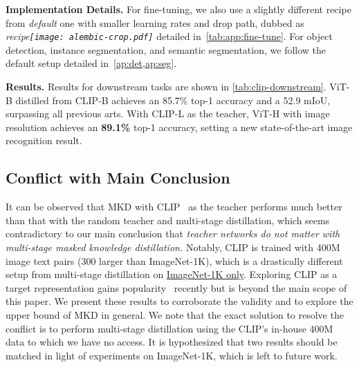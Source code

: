\documentclass[10pt,twocolumn,letterpaper]{article}
\def \alambic {\texttt{[image: alembic-crop.pdf]}\xspace}
\begin{document}
\noindent\textbf{Implementation Details.} For fine-tuning, we also use a slightly different recipe from \textit{default} one with smaller learning rates and drop path, dubbed as \textit{recipe\alambic} detailed in~\cref{tab:app:fine-tune}. For object detection, instance segmentation, and semantic segmentation, we follow the default setup detailed in~\cref{ap:det,ap:seg}.

\noindent\textbf{Results.} Results for downstream tasks are shown in \cref{tab:clip-downstream}. 
ViT-B distilled from CLIP-B achieves an 85.7\% top-1 accuracy and a 52.9 mIoU, surpassing all previous arts.
With CLIP-L as the teacher, ViT-H with image resolution  achieves an \textbf{89.1\%} top-1 accuracy, setting a new state-of-the-art image recognition result.

\subsection{Conflict with Main Conclusion}

It can be observed that MKD with CLIP~\cite{clip} as the teacher performs much better than that with the random teacher and multi-stage distillation, which seems contradictory to our main conclusion that \textit{teacher networks do not matter with multi-stage masked knowledge distillation.}
Notably, CLIP is trained with 400M image text pairs (300 larger than ImageNet-1K), which is a drastically different setup from multi-stage distillation on \underline{ImageNet-1K only}. 
Exploring CLIP as a target representation gains popularity~\cite{wei2022mvp} recently but is beyond the main scope of this paper. We present these results to corroborate the validity and to explore the upper bound of MKD in general.
We note that the exact solution to resolve the conflict is to perform multi-stage distillation using the CLIP's in-house 400M data to which we have no access. It is hypothesized that two results should be matched in light of experiments on  ImageNet-1K, which is left to future work.
\end{document}
